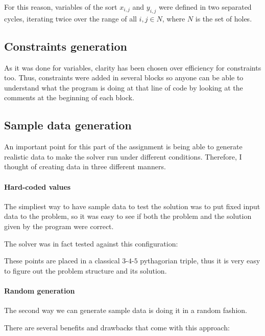 For this reason, variables of the sort $x_{i,j}$ and $y_{i,j}$ were defined in
two separated cycles, iterating twice over the range of all $i,j\in{N}$, where
$N$ is the set of holes.

\subsection{Constraints generation}
As it was done for variables, clarity has been chosen over efficiency for
constraints too. Thus, constraints were added in several blocks so anyone can
be able to understand what the program is doing at that line of code by looking
at the comments at the beginning of each block.

\subsection{Sample data generation}
An important point for this part of the assignment is being able to generate
realistic data to make the solver run under different conditions.
Therefore, I thought of creating data in three different manners.

\paragraph{Hard-coded values} The simpliest way to have sample data to test the
solution was to put fixed input data to the problem, so it was easy to see if
both the problem and the solution given by the program were correct.

The solver was in fact tested against this configuration:

\begin{figure}[h!]
\centering
{}
\end{figure}

These points are placed in a classical $3$-$4$-$5$ pythagorian triple, thus it
is very easy to figure out the problem structure and its solution.

\paragraph{Random generation} The second way we can generate sample data is
doing it in a random fashion.

There are several benefits and drawbacks that come with this approach:

